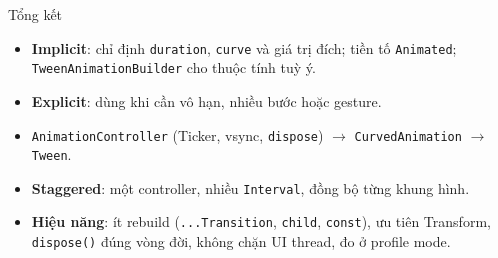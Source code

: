 \documentclass[aspectratio=169,10pt]{beamer}
\begin{document}
\begin{frame}{Tổng kết}
  \begin{itemize}
    \item \textbf{Implicit}: chỉ định \texttt{duration}, \texttt{curve} và giá trị đích;
          tiền tố \texttt{Animated}; \texttt{TweenAnimationBuilder} cho thuộc tính tuỳ ý.
    \item \textbf{Explicit}: dùng khi cần vô hạn, nhiều bước hoặc gesture.
    \item \texttt{AnimationController} (Ticker, vsync, \texttt{dispose})
          $\rightarrow$ \texttt{CurvedAnimation} $\rightarrow$ \texttt{Tween}.
    \item \textbf{Staggered}: một controller, nhiều \texttt{Interval}, đồng bộ từng khung hình.
    \item \textbf{Hiệu năng}: ít rebuild (\texttt{...Transition}, \texttt{child}, \texttt{const}),
          ưu tiên Transform, \texttt{dispose()} đúng vòng đời, không chặn UI thread,
          đo ở profile mode.
  \end{itemize}
\end{frame}
\end{document}
